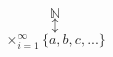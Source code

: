 \documentclass[10pt]{article}
\begin{document}
\large $$  \mathbb{N} $$
$$ \updownarrow $$
$$ \times_{i=1}^{\infty} \{a, b, c ,...  \} $$
\end{document}
